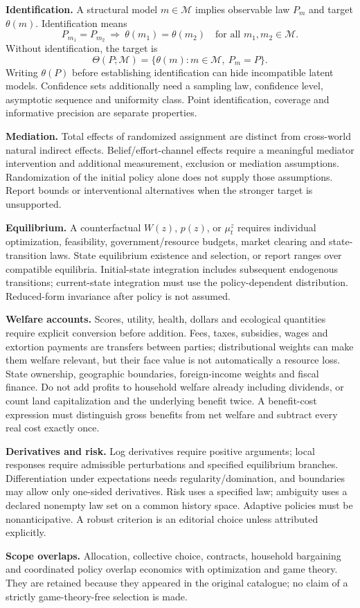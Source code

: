 \documentclass[11pt,a4paper]{article}
\begin{document}
\textbf{Identification.} A structural model \(m\in\mathcal M\) implies observable law \(P_m\) and target \(\theta(m)\). Identification means
\[
 P_{m_1}=P_{m_2}\ \Longrightarrow\ \theta(m_1)=\theta(m_2)
 \quad\text{for all }m_1,m_2\in\mathcal M .
\]
Without identification, the target is
\[
 \Theta(P;\mathcal M)=\{\theta(m):m\in\mathcal M,\ P_m=P\}.
\]
Writing \(\theta(P)\) before establishing identification can hide incompatible latent models. Confidence sets additionally need a sampling law, confidence level, asymptotic sequence and uniformity class. Point identification, coverage and informative precision are separate properties.

\textbf{Mediation.} Total effects of randomized assignment are distinct from cross-world natural indirect effects. Belief/effort-channel effects require a meaningful mediator intervention and additional measurement, exclusion or mediation assumptions. Randomization of the initial policy alone does not supply those assumptions. Report bounds or interventional alternatives when the stronger target is unsupported.

\textbf{Equilibrium.} A counterfactual \(W(z)\), \(p(z)\), or \(\mu_t^z\) requires individual optimization, feasibility, government/resource budgets, market clearing and state-transition laws. State equilibrium existence and selection, or report ranges over compatible equilibria. Initial-state integration includes subsequent endogenous transitions; current-state integration must use the policy-dependent distribution. Reduced-form invariance after policy is not assumed.

\textbf{Welfare accounts.} Scores, utility, health, dollars and ecological quantities require explicit conversion before addition. Fees, taxes, subsidies, wages and extortion payments are transfers between parties; distributional weights can make them welfare relevant, but their face value is not automatically a resource loss. State ownership, geographic boundaries, foreign-income weights and fiscal finance. Do not add profits to household welfare already including dividends, or count land capitalization and the underlying benefit twice. A benefit-cost expression must distinguish gross benefits from net welfare and subtract every real cost exactly once.

\textbf{Derivatives and risk.} Log derivatives require positive arguments; local responses require admissible perturbations and specified equilibrium branches. Differentiation under expectations needs regularity/domination, and boundaries may allow only one-sided derivatives. Risk uses a specified law; ambiguity uses a declared nonempty law set on a common history space. Adaptive policies must be nonanticipative. A robust criterion is an editorial choice unless attributed explicitly.

\textbf{Scope overlaps.} Allocation, collective choice, contracts, household bargaining and coordinated policy overlap economics with optimization and game theory. They are retained because they appeared in the original catalogue; no claim of a strictly game-theory-free selection is made.
\end{document}
